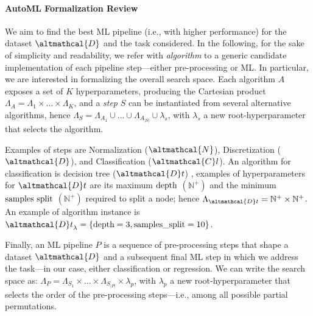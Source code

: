 \paragraph{AutoML Formalization Review}
\label{hamlet-ssec:automl-formalization}
We aim to find the best ML pipeline (i.e., with higher performance) for the dataset $\altmathcal{D}$ and the task considered.
In the following, for the sake of simplicity and readability, we refer with \textit{algorithm} to a generic candidate implementation of each pipeline step---either pre-processing or ML.
In particular, we are interested in formalizing the overall search space.
Each algorithm $A$ exposes a set of $K$ hyperparameters, producing the Cartesian product $\Lambda_A = \Lambda_1 \times \dots \times \Lambda_K$, and a \textit{step} $S$ can be instantiated from several alternative algorithms, hence $\Lambda_S = \Lambda_{A_1} \cup \ldots \cup \Lambda_{A_{|S|}} \cup \lambda_s$, with $\lambda_s$ a new root-hyperparameter that selects the algorithm.

\begin{example}
    Examples of steps are Normalization ($\altmathcal{N}$), Discretization ($\altmathcal{D}$), and Classification ($\altmathcal{C}l$).
    An algorithm for classification is decision tree  ($\altmathcal{D}t$) \cite{DBLP:books/wa/BreimanFOS84},
    examples of hyperparameters for $\altmathcal{D}t$ are its maximum $\textup{depth}$ $(\mathbb{N}^+)$ and the minimum $\textup{samples split}$ $(\mathbb{N}^+)$ required to split a node; hence $\Lambda_{\altmathcal{D}t} = \mathbb{N}^+ \times \mathbb{N}^+$.
    An example of algorithm instance is ${\altmathcal{D}t}_{\lambda}= \{ \textup{depth}=3,\textup{samples\_split}=10 \}$.
\end{example}

Finally, an ML pipeline $P$ is a sequence of pre-processing steps that shape a dataset $\altmathcal{D}$ and a subsequent final ML step in which we address the task---in our case, either classification or regression.
We can write the search space as: $\Lambda_P = \Lambda_{S_1} \times \ldots \times \Lambda_{S_{|P|}} \times \lambda_p$, with $\lambda_p$ a new root-hyperparameter that selects the order of the pre-processing steps---i.e., among all possible partial permutations.

